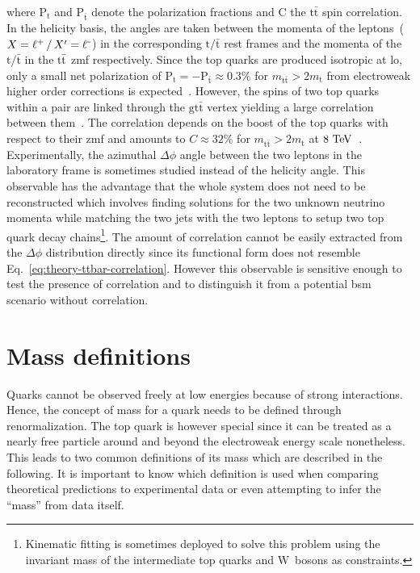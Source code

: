 where $\mathrm{P}_\mathrm{t}$ and $\mathrm{P}_{\bar{\mathrm{t}}}$ denote the polarization fractions and $\mathrm{C}$ the $\mathrm{t\bar{t}}$ spin correlation. In the helicity basis, the angles are taken between the momenta of the leptons~($X=\ell^{\rmplus}\,/\,X^\prime=\ell^{\rmminus}$) in the corresponding $\mathrm{t}/\bar{\mathrm{t}}$ rest frames and the momenta of the $\mathrm{t}/\bar{\mathrm{t}}$ in the $\mathrm{t}\bar{\mathrm{t}}$ \gls{zmf} respectively. Since the top quarks are produced isotropic at \gls{lo}, only a small net polarization of $\mathrm{P}_\mathrm{t}=-\mathrm{P}_{\bar{\mathrm{t}}}\approx0.3\%$ for $m_\mathrm{t\bar{t}}>2m_\mathrm{t}$ from electroweak higher order corrections is expected~\cite{Bernreuther:2010ny,Bernreuther:2013aga}. However, the spins of two top quarks within a pair are linked through the $\mathrm{g\mathrm{t}\bar{\mathrm{t}}}$ vertex yielding a large correlation between them~\cite{Mahlon:2010gw}. The correlation depends on the boost of the top quarks with respect to their \gls{zmf} and amounts to $C\approx32\%$ for $m_\mathrm{t\bar{t}}>2m_\mathrm{t}$ at $8~\mathrm{TeV}$~\cite{Bernreuther:2013aga}. Experimentally, the azimuthal $\Delta\phi$ angle between the two leptons in the laboratory frame is sometimes studied instead of the helicity angle. This observable has the advantage that the whole \ttbar system does not need to be reconstructed which involves finding solutions for the two unknown neutrino momenta while matching the two jets with the two leptons to setup two top quark decay chains\footnote{Kinematic fitting is sometimes deployed to solve this problem using the invariant mass of the intermediate top quarks and $\mathrm{W}$~bosons as constraints.}. The amount of correlation cannot be easily extracted from the $\Delta\phi$ distribution directly since its functional form does not resemble Eq.~\ref{eq:theory-ttbar-correlation}. However this observable is sensitive enough to test the presence of \ttbar correlation and to distinguish it from a potential \gls{bsm} scenario without correlation.


\section{Mass definitions}

Quarks cannot be observed freely at low energies because of strong interactions. Hence, the concept of mass for a quark needs to be defined through renormalization. The top quark is however special since it can be treated as a nearly free particle around and beyond the electroweak energy scale nonetheless. This leads to two common definitions of its mass which are described in the following. It is important to know which definition is used when comparing theoretical predictions to experimental data or even attempting to infer the ``mass'' from data itself.

